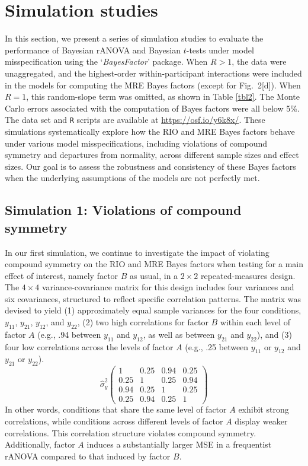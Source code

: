 \documentclass[preprint,12pt,authoryear]{elsarticle}
\begin{document}
\section{Simulation studies}
\label{sec4}

In this section, we present a series of simulation studies to evaluate the performance of Bayesian rANOVA and Bayesian $t$-tests under model misspecification using the `\textit{BayesFactor}' package. When $R>1$, the data were unaggregated, and the highest-order within-participant interactions were included in the models for computing the MRE Bayes factors (except for Fig.~2[d]). When $R=1$, this random-slope term was omitted, as shown in Table \ref{tbl2}. The Monte Carlo errors associated with the computation of Bayes factors were all below 5\%. The data set and \texttt{R} scripts are available at \url{https://osf.io/y6k8x/}. These simulations systematically explore how the RIO and MRE Bayes factors behave under various model misspecifications, including violations of compound symmetry and departures from normality, across different sample sizes and effect sizes. Our goal is to assess the robustness and consistency of these Bayes factors when the underlying assumptions of the models are not perfectly met.


\subsection{Simulation 1: Violations of compound symmetry}
\label{sec4.1}

In our first simulation, we continue to investigate the impact of violating compound symmetry on the RIO and MRE Bayes factors when testing for a main effect of interest, namely factor $B$ as usual, in a $2\times2$ repeated-measures design. The $4\times4$ variance-covariance matrix for this design includes four variances and six covariances, structured to reflect specific correlation patterns. The matrix was devised to yield (1) approximately equal sample variances for the four conditions, $y_{11}$, $y_{21}$, $y_{12}$, and $y_{22}$, (2) two high correlations for factor $B$ within each level of factor $A$ (e.g., .94 between $y_{11}$ and $y_{12}$, as well as between $y_{21}$ and $y_{22}$), and (3) four low correlations across the levels of factor $A$ (e.g., .25 between $y_{11}$ or $y_{12}$ and $y_{21}$ or $y_{22}$).
\begin{equation*}
	\hat{\sigma}_y^2\begin{pmatrix} 1 & 0.25 & 0.94 & 0.25 \\ 0.25 & 1 & 0.25 & 0.94 \\ 0.94 & 0.25 & 1 & 0.25 \\ 0.25 & 0.94 & 0.25 & 1 \end{pmatrix}
\end{equation*}
In other words, conditions that share the same level of factor $A$ exhibit strong correlations, while conditions across different levels of factor $A$ display weaker correlations. This correlation structure violates compound symmetry. Additionally, factor $A$ induces a substantially larger MSE in a frequentist rANOVA compared to that induced by factor $B$.
\end{document}
